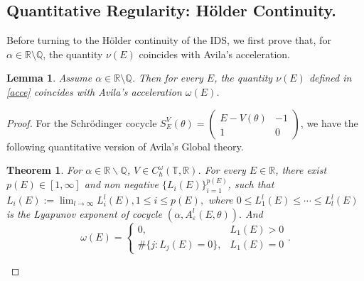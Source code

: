 \documentclass[reqno,11pt]{amsart}
\newtheorem{theorem}{Theorem}[section]
\newtheorem{lemma}{Lemma}[section]
\newcommand{\R}{{\mathbb R}}
\newcommand{\Q}{{\mathbb Q}}
\newcommand{\T}{{\mathbb T}}
\begin{document}
\subsection{Quantitative Regularity: H\"older Continuity.}
Before turning to the H\"older continuity of the IDS, we first prove that, for $\alpha \in \mathbb{R}\setminus\mathbb{Q}$, the quantity $\nu(E)$ coincides with Avila's acceleration.
\begin{lemma}\label{lem:acce}
    Assume $\alpha\in \mathbb{R}\setminus\mathbb{Q}$. Then for every $E$,
the quantity $\nu(E)$ defined in \eqref{acce} coincides with Avila's acceleration $\omega(E)$.
\end{lemma}
\begin{proof}
    For the Schr\"odinger cocycle $S_E^V(\theta)=\begin{pmatrix}
    E-V(\theta)&-1\\1&0
\end{pmatrix}$, we have the following quantitative version of Avila's Global theory.

\begin{theorem}\cite{GJYZ}\label{quanglobal}
    For $\alpha\in\R\backslash\Q$, $V\in C_h^\omega(\T,\R)$. For every $E\in\mathbb R$, there exist $p(E)\in[1,\infty]$ and non negative $\{{L}_i(E)\}_{i=1}^{p(E)}$, such that   ${L}_i(E):=\lim_{l\to\infty}L_i^l(E), 1\leq i\leq p(E),$ where $0\leq L_1^l(E)\leq\cdots\leq L_l^l(E)$ is the Lyapunov exponent of cocycle $(\alpha, A_{\varepsilon}^{l}(E,\theta)).$ And $$\omega(E)=\begin{cases}
        0,   &{L}_1(E)>0\\ 
        \#\{j:{L}_j(E)=0\},&{L}_1(E)=0
    \end{cases}.$$
\end{theorem}



\end{proof}
\end{document}
